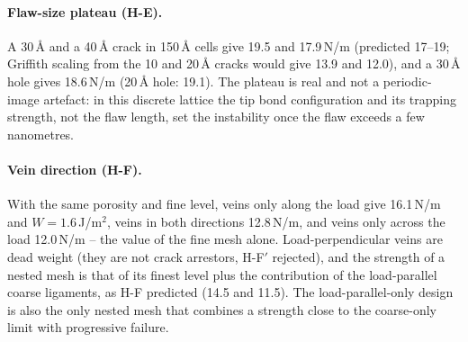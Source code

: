 \paragraph{Flaw-size plateau (H-E).} A 30\,\AA{} and a 40\,\AA{} crack in 150\,\AA{} cells give 19.5 and 17.9\,N/m (predicted 17--19; Griffith scaling from the 10 and 20\,\AA{} cracks would give 13.9 and 12.0), and a 30\,\AA{} hole gives 18.6\,N/m (20\,\AA{} hole: 19.1). The plateau is real and not a periodic-image artefact: in this discrete lattice the tip bond configuration and its trapping strength, not the flaw length, set the instability once the flaw exceeds a few nanometres.

\paragraph{Vein direction (H-F).} With the same porosity and fine level, veins only along the load give 16.1\,N/m and $W=1.6$\,J/m$^2$, veins in both directions 12.8\,N/m, and veins only across the load 12.0\,N/m -- the value of the fine mesh alone. Load-perpendicular veins are dead weight (they are not crack arrestors, H-F$'$ rejected), and the strength of a nested mesh is that of its finest level plus the contribution of the load-parallel coarse ligaments, as H-F predicted (14.5 and 11.5). The load-parallel-only design is also the only nested mesh that combines a strength close to the coarse-only limit with progressive failure.
